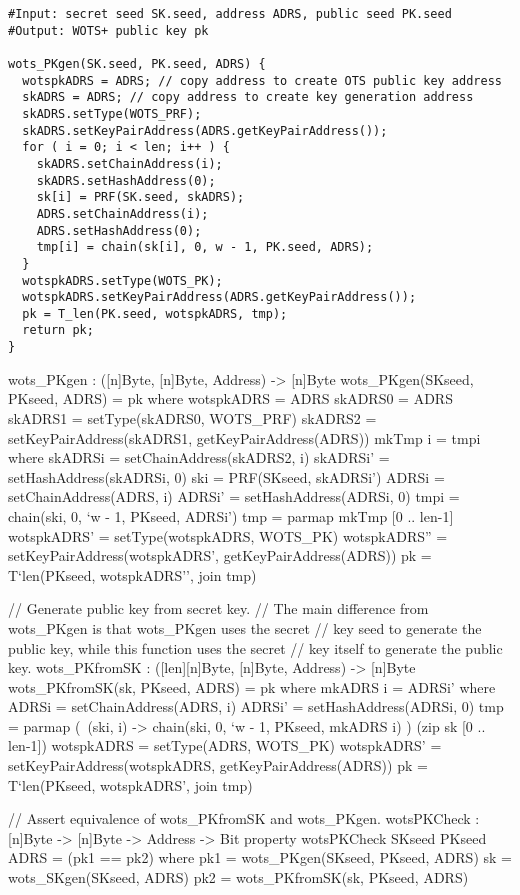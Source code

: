 \begin{lstlisting}[label=alg:wots_pkgen, language=pseudoc,
                   caption=\texttt{wots\_PKgen} -- Generating a \wotsp public key.]
#Input: secret seed SK.seed, address ADRS, public seed PK.seed
#Output: WOTS+ public key pk

wots_PKgen(SK.seed, PK.seed, ADRS) {
  wotspkADRS = ADRS; // copy address to create OTS public key address
  skADRS = ADRS; // copy address to create key generation address
  skADRS.setType(WOTS_PRF);
  skADRS.setKeyPairAddress(ADRS.getKeyPairAddress());
  for ( i = 0; i < len; i++ ) {
    skADRS.setChainAddress(i);
    skADRS.setHashAddress(0);
    sk[i] = PRF(SK.seed, skADRS);
    ADRS.setChainAddress(i);
    ADRS.setHashAddress(0);
    tmp[i] = chain(sk[i], 0, w - 1, PK.seed, ADRS);
  }
  wotspkADRS.setType(WOTS_PK);
  wotspkADRS.setKeyPairAddress(ADRS.getKeyPairAddress());
  pk = T_len(PK.seed, wotspkADRS, tmp);
  return pk;
}
\end{lstlisting}

\begin{code}
  wots_PKgen : ([n]Byte, [n]Byte, Address) -> [n]Byte
  wots_PKgen(SKseed, PKseed, ADRS) = pk where
    wotspkADRS = ADRS
    skADRS0 = ADRS
    skADRS1 = setType(skADRS0, WOTS_PRF)
    skADRS2 = setKeyPairAddress(skADRS1, getKeyPairAddress(ADRS))
    mkTmp i = tmpi where
      skADRSi = setChainAddress(skADRS2, i)
      skADRSi' = setHashAddress(skADRSi, 0)
      ski = PRF(SKseed, skADRSi')
      ADRSi = setChainAddress(ADRS, i)
      ADRSi' = setHashAddress(ADRSi, 0)
      tmpi = chain(ski, 0, `w - 1, PKseed, ADRSi')
    tmp = parmap mkTmp [0 .. len-1]
    wotspkADRS' = setType(wotspkADRS, WOTS_PK)
    wotspkADRS'' = setKeyPairAddress(wotspkADRS', getKeyPairAddress(ADRS))
    pk = T`{len}(PKseed, wotspkADRS'', join tmp)

  // Generate public key from secret key.
  // The main difference from wots_PKgen is that wots_PKgen uses the secret
  // key seed to generate the public key, while this function uses the secret
  // key itself to generate the public key.
  wots_PKfromSK : ([len][n]Byte, [n]Byte, Address) -> [n]Byte
  wots_PKfromSK(sk, PKseed, ADRS) = pk where
    mkADRS i = ADRSi' where
      ADRSi = setChainAddress(ADRS, i)
      ADRSi' = setHashAddress(ADRSi, 0)
    tmp = parmap (\ (ski, i) -> chain(ski, 0, `w - 1, PKseed, mkADRS i) )
                 (zip sk [0 .. len-1])
    wotspkADRS = setType(ADRS, WOTS_PK)
    wotspkADRS' = setKeyPairAddress(wotspkADRS, getKeyPairAddress(ADRS))
    pk = T`{len}(PKseed, wotspkADRS', join tmp)

  // Assert equivalence of wots_PKfromSK and wots_PKgen.
  wotsPKCheck : [n]Byte -> [n]Byte -> Address -> Bit
  property wotsPKCheck SKseed PKseed ADRS = (pk1 == pk2) where
    pk1 = wots_PKgen(SKseed, PKseed, ADRS)
    sk = wots_SKgen(SKseed, ADRS)
    pk2 = wots_PKfromSK(sk, PKseed, ADRS)
\end{code}

